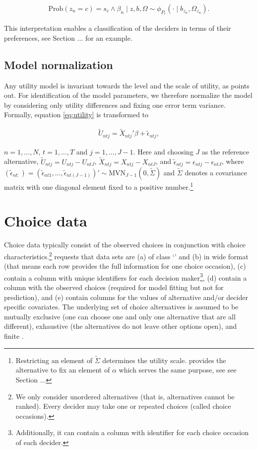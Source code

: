 \documentclass[article]{jss}
\newcommand{\class}[1]{`\code{#1}'}
\begin{document}
\begin{align*}
\text{Prob}(z_n=c)=s_c \land \beta_n \mid z,b,\Omega \sim \phi_{P_r}(\cdot \mid b_{z_n},\Omega_{z_n}).
\end{align*}

This interpretation enables a classification of the deciders in terms of their preferences, see Section ... for an example.

\subsection{Model normalization} \label{subsec:normalization}

Any utility model is invariant towards the level and the scale of utility, as \cite{Train:2009} points out. For identification of the model parameters, we therefore normalize the model by considering only utility differences and fixing one error term variance. Formally, equation \eqref{eq:utility} is transformed to

\begin{align*}
\tilde{U}_{ntj} = \tilde{X}_{ntj}' \beta + \tilde{\epsilon}_{ntj},
\end{align*}

$n=1,\dots,N$, $t=1,\dots,T$ and $j=1,\dots,J-1$. Here and choosing $J$ as the reference alternative, $\tilde{U}_{ntj} = U_{ntj} - U_{ntJ}$, $\tilde{X}_{ntj} = X_{ntj} - X_{ntJ}$, and $\tilde{\epsilon}_{ntj} = \epsilon_{ntj} - \epsilon_{ntJ}$, where $(\tilde{\epsilon}_{nt:}) = (\tilde{\epsilon}_{nt1},...,\tilde{\epsilon}_{nt(J-1)})' \sim \text{MVN}_{J-1} (0,\tilde{\Sigma})$ and $\tilde{\Sigma}$ denotes a covariance matrix with one diagonal element fixed to a positive number.\footnote{Restricting an element of $\tilde{\Sigma}$ determines the utility scale.  provides the alternative to fix an element of $\alpha$ which serves the same purpose, see see Section ...}

\section{Choice data} \label{sec:choice_data}

Choice data typically consist of the observed choices in conjunction with choice characteristics.\footnote{We only consider unordered alternatives (that is, alternatives cannot be ranked). Every decider may take one or repeated choices (called choice occasions).}  requests that data sets are (a) of class \class{data.frame} and (b) in wide format (that means each row provides the full information for one choice occasion), (c) contain a column with unique identifiers for each decision maker\footnote{Additionally, it can contain a column with identifier for each choice occasion of each decider.}, (d) contain a column with the observed choices (required for model fitting but not for prediction), and (e) contain columns for the values of alternative and/or decider specific covariates. The underlying set of choice alternatives is assumed to be mutually exclusive (one can choose one and only one alternative that are all different), exhaustive (the alternatives do not leave other options open), and finite \citep{Train:2009}.
\end{document}
